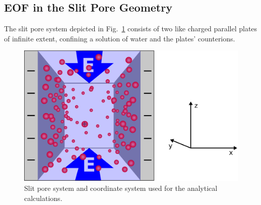\subsection{EOF in the Slit Pore Geometry}

The slit pore system depicted in Fig.~\ref{fig:slit_pore} consists of two like charged parallel plates of infinite extent,
confining a solution of water and the plates' counterions.

\begin{figure}[h]
  \begin{center}
  \includegraphics[width=0.5\columnwidth]{figures/schlitzpore_3d.pdf}
  \end{center}
  \caption{\label{fig:slit_pore}Slit pore system and coordinate system used for the analytical calculations.}
\end{figure}

